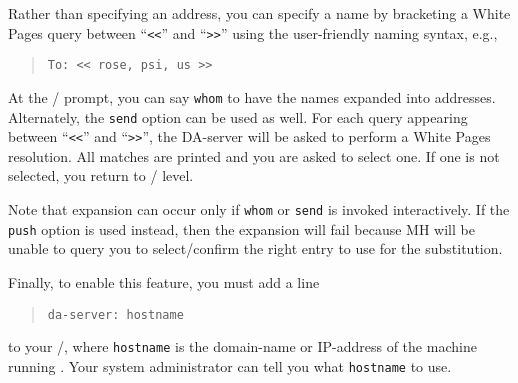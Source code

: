Rather than specifying an address,
you can specify a name by bracketing a White Pages query between
``\verb"<<"'' and ``\verb">>"'' using the user-friendly naming syntax,
 e.g.,
\begin{quote}\small\begin{verbatim}
To: << rose, psi, us >>
\end{verbatim}\end{quote}
At the \whatnow/ prompt,
you can say \verb"whom" to have the names expanded into addresses.
Alternately, the \verb"send" option can be used as well.
For each query appearing between ``\verb"<<"'' and ``\verb">>"'',
the DA-server will be asked to perform a White Pages resolution.
All matches are printed and you are asked to select one.
If one is not selected,
you return to \whatnow/ level.

Note that expansion can occur only if \verb"whom" or \verb"send" is invoked
interactively. 
If the \verb"push" option is used instead,
then the expansion will fail because MH will be unable to query 
you to select/confirm the right entry to use for the substitution.

Finally,
to enable this feature,
you must add a line
\begin{quote}\small\begin{verbatim}
da-server: hostname
\end{verbatim}\end{quote}
to your \profile/,
where \verb"hostname" is the domain-name or IP-address of the machine running
.
Your system administrator can tell you what \verb"hostname" to use.
